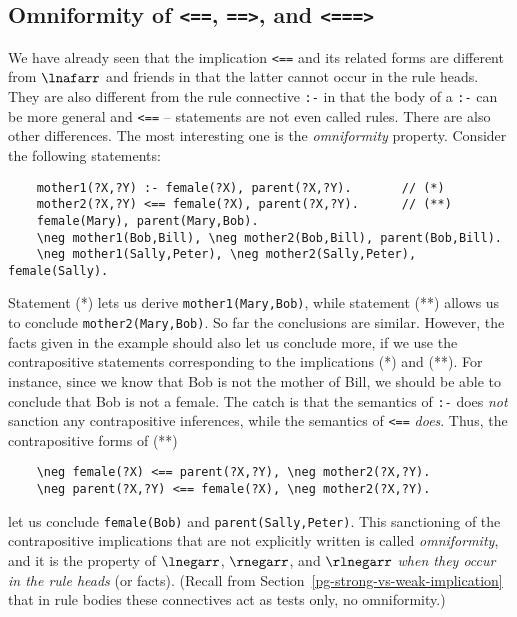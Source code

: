 \subsection{Omniformity of \texttt{<==}, \texttt{==>}, and \texttt{<===>}}
We have already seen that the implication \texttt{<==} and its related forms
are different from $\lnafarr$ and friends in that the latter cannot occur in
the rule heads. They are also different from the rule connective
\texttt{:-} in that the body of a \texttt{:-} can be more general and
\texttt{<==} -- statements are not even called rules.
There are also other differences.
The most interesting one is the \emph{omniformity} property. 
Consider the following statements:
\begin{verbatim}
    mother1(?X,?Y) :- female(?X), parent(?X,?Y).       // (*)
    mother2(?X,?Y) <== female(?X), parent(?X,?Y).      // (**)
    female(Mary), parent(Mary,Bob).
    \neg mother1(Bob,Bill), \neg mother2(Bob,Bill), parent(Bob,Bill).
    \neg mother1(Sally,Peter), \neg mother2(Sally,Peter), female(Sally).
\end{verbatim}
Statement (*) lets us derive \texttt{mother1(Mary,Bob)}, while
statement (**) allows us to conclude \texttt{mother2(Mary,Bob)}.
So far the conclusions are similar. However, the facts given in the example
should also let us conclude more, if we use the contrapositive statements
corresponding to the implications
(*) and (**). For instance, since we know that Bob is not the mother of Bill,
we should be able to conclude that Bob is not a female.
The catch is that the semantics of \texttt{:-}  
does \emph{not} sanction any contrapositive inferences, while the semantics
of \texttt{<==} \emph{does}. Thus, the contrapositive forms of (**)
\begin{verbatim}
    \neg female(?X) <== parent(?X,?Y), \neg mother2(?X,?Y).
    \neg parent(?X,?Y) <== female(?X), \neg mother2(?X,?Y).
\end{verbatim}
let us conclude \texttt{\RULELOGNEG female(Bob)} and
\texttt{\RULELOGNEG parent(Sally,Peter)}. 
This sanctioning of the contrapositive implications that are not explicitly
written is called \emph{omniformity}, and it is the property of
$\lnegarr$, $\rnegarr$, and $\rlnegarr$ \emph{when they occur in the rule
  heads} (or facts). (Recall from
Section~\ref{pg-strong-vs-weak-implication} that in rule bodies these
connectives act as tests only, no omniformity.)

